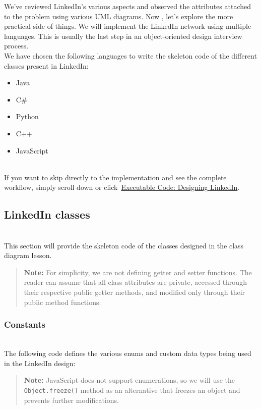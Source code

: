 

We've reviewed LinkedIn's various aspects and observed the attributes attached to the problem using various UML diagrams. Now , let's explore the more practical side of things. We will implement the LinkedIn network using multiple languages. This is usually the last step in an object-oriented design interview process.
\\
We have chosen the following languages to write the skeleton code of the different classes present in LinkedIn:

\begin{itemize}
\item
\protect{}\label{6FaaQONUvywtbdyHyuXv_}
Java
\item
\protect{}\label{4rYNo4NzLydhJ1Wnia9DC}
C\#
\item
\protect{}\label{lqaYRl4VFdv6GsrS8HMHB}
Python
\item
\protect{}\label{RTGTXRliywNc6SfDsfSe4}
C++
\item
\protect{}\label{n6NNkz2IYP7UMSX9qB7Yd}
JavaScript
\end{itemize}
\\
If you want to skip directly to the implementation and see the complete workflow, simply scroll down or click~\hyperref[Executable-code-Designing-LinkedIn]{Executable Code: Designing LinkedIn}.

\subsection{LinkedIn classes}\label{HWWWO9BJuj0MQDkqv-iGS}
\\
This section will provide the skeleton code of the classes designed in the class diagram lesson.
\begin{quote}
\textbf{Note:} For simplicity, we are not defining getter and setter functions. The reader can assume that all class attributes are private, accessed through their respective public getter methods, and modified only through their public method functions.
\end{quote}
\subsubsection{Constants}\label{07f6fUZCabYvPLkDPg5J_}
\\
The following code defines the various enums and custom data types being used in the LinkedIn design:
\begin{quote}
\textbf{Note:} JavaScript does not support enumerations, so we will use the \texttt{Object.freeze()} method as an alternative that freezes an object and prevents further modifications.
\end{quote}

